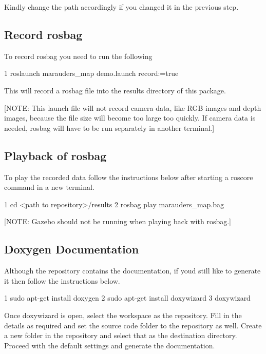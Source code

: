 Kindly change the path accordingly if you changed it in the previous step.

\subsection*{Record rosbag}

To record rosbag you need to run the following


\begin{DoxyCode}
1 roslaunch marauders\_map demo.launch record:=true
\end{DoxyCode}


This will record a rosbag file into the results directory of this package.

\mbox{[}N\+O\+TE\+: This launch file will not record camera data, like R\+GB images and depth images, because the file size will become too large too quickly. If camera data is needed, rosbag will have to be run separately in another terminal.\mbox{]}

\subsection*{Playback of rosbag}

To play the recorded data follow the instructions below after starting a roscore command in a new terminal.


\begin{DoxyCode}
1 cd <path to repository>/results
2 rosbag play marauders\_map.bag
\end{DoxyCode}


\mbox{[}N\+O\+TE\+: Gazebo should not be running when playing back with rosbag.\mbox{]}

\subsection*{Doxygen Documentation}

Although the repository contains the documentation, if you\textquotesingle{}d still like to generate it then follow the instructions below.


\begin{DoxyCode}
1 sudo apt-get install doxygen
2 sudo apt-get install doxywizard
3 doxywizard
\end{DoxyCode}


Once doxywizard is open, select the workspace as the repository. Fill in the details as required and set the source code folder to the repository as well. Create a new folder in the repository and select that as the destination directory. Proceed with the default settings and generate the documentation. 